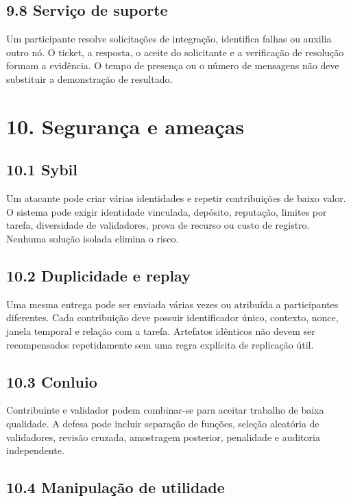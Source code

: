 \documentclass[12pt,a4paper]{article}
\begin{document}
\subsection{9.8 Serviço de suporte}

Um participante resolve solicitações de integração, identifica falhas ou auxilia outro nó. O ticket, a resposta, o aceite do solicitante e a verificação de resolução formam a evidência. O tempo de presença ou o número de mensagens não deve substituir a demonstração de resultado.\\


\section{10. Segurança e ameaças}

\subsection{10.1 Sybil}

Um atacante pode criar várias identidades e repetir contribuições de baixo valor. O sistema pode exigir identidade vinculada, depósito, reputação, limites por tarefa, diversidade de validadores, prova de recurso ou custo de registro. Nenhuma solução isolada elimina o risco.\\

\subsection{10.2 Duplicidade e replay}

Uma mesma entrega pode ser enviada várias vezes ou atribuída a participantes diferentes. Cada contribuição deve possuir identificador único, contexto, nonce, janela temporal e relação com a tarefa. Artefatos idênticos não devem ser recompensados repetidamente sem uma regra explícita de replicação útil.\\

\subsection{10.3 Conluio}

Contribuinte e validador podem combinar-se para aceitar trabalho de baixa qualidade. A defesa pode incluir separação de funções, seleção aleatória de validadores, revisão cruzada, amostragem posterior, penalidade e auditoria independente.\\

\subsection{10.4 Manipulação de utilidade}
\end{document}
